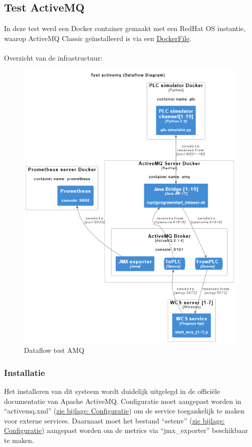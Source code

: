 \subsection{Test ActiveMQ}
In deze test werd een Docker container gemaakt met een RedHat OS instantie, waarop ActiveMQ Classic 
geïnstalleerd is via een \hyperref[listing:docker_amq]{DockerFile}.
\\\\
Overzicht van de infrastructuur:
\begin{figure}[h!]
  \centering
  \includegraphics[width=.95\textwidth]{img/test_amq_dataflow.png}
  \caption{\label{fig:test_amq_dataflow}Dataflow test AMQ}
\end{figure}

\subsubsection{Installatie}
Het installeren van dit systeem wordt duidelijk uitgelegd in de officiële documentatie van Apache ActiveMQ.
Configuratie moet aangepast worden in ``activemq.xml'' (\hyperref[listing:configxml_activemq]{zie bijlage: Configuratie}) om de service toegankelijk te maken voor externe services.
Daarnaast moet het bestand ``setenv'' (\hyperref[listing:configxml_activemq]{zie bijlage: Configuratie}) aangepast worden om de metrics via ``jmx\_exporter'' beschikbaar te maken.

